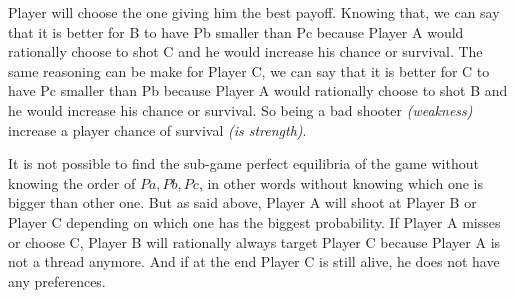 \documentclass[11pt]{article}
\begin{document}
Player will choose the one giving him the best payoff. Knowing that, we can say that it is better for B to have Pb smaller than Pc because Player A would rationally choose to shot C and he would increase his chance or survival. The same reasoning can be make for Player C, we can say that it is better for C to have Pc smaller than Pb because Player A would rationally choose to shot B and he would increase his chance or survival. So being a bad shooter \textit{(weakness)} increase a player chance of survival \textit{(is strength)}.

It is not possible to find the sub-game perfect equilibria of the game without knowing the order of $Pa, Pb, Pc$, in other words without knowing which one is bigger than other one. But as said above, Player A will shoot at Player B or Player C depending on which one has the biggest probability. If Player A misses or choose C, Player B will rationally always target Player C because Player A is not a thread anymore. And if at the end Player C is still alive, he does not have any preferences.

 
\end{document}

